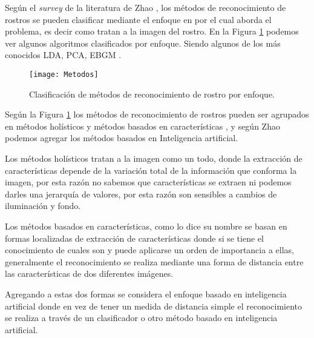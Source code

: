 
Según el \textit{survey} de la literatura de Zhao \cite{zhao2003face}, los métodos de reconocimiento de rostros se pueden clasificar mediante el enfoque en por el cual aborda el problema, es decir como tratan a la imagen del rostro. En la Figura \ref{im:métodos} podemos ver algunos algoritmos clasificados por enfoque. Siendo algunos de los más conocidos \acf{LDA}, \acf{PCA}, \acf{EBGM} \cite{zhao2003face}.

\begin{figure}[h]
\center
\texttt{[image: Metodos]}
\caption{Clasificación de métodos de reconocimiento de rostro por enfoque.}
\label{im:métodos}
\end{figure}

Según la Figura \ref{im:métodos} los métodos de reconocimiento de rostros pueden ser agrupados en métodos holísticos y métodos basados en características \cite{tseng2003comparison}, y según Zhao \cite{zhao2003face} podemos agregar los métodos basados en Inteligencia artificial.

Los métodos holísticos tratan a la imagen como un todo, donde la extracción de características depende de la variación total de la información que conforma la imagen, por esta razón no sabemos que características se extraen ni podemos darles una jerarquía de valores, por esta razón son sensibles a cambios de iluminación y fondo.

Los métodos basados en características, como lo dice su nombre se basan en formas localizadas de extracción de características donde si se tiene el conocimiento de cuales son y puede aplicarse un orden de importancia a ellas, generalmente el reconocimiento se realiza mediante una forma de distancia entre las características de dos diferentes imágenes.

Agregando a estas dos formas se considera el enfoque basado en inteligencia artificial donde en vez de tener un medida de distancia simple el reconocimiento se realiza a través de un clasificador o otro método basado en inteligencia artificial.


